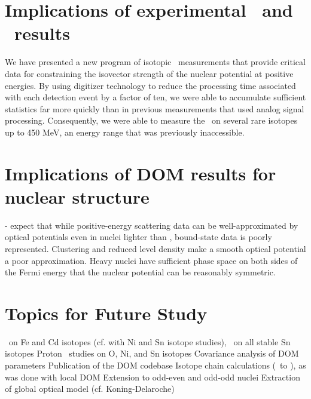\section{Implications of experimental \tot\ and \el\ results}
We have presented a new program of isotopic \tot\ measurements that provide critical data for
constraining the isovector strength of the nuclear potential at positive energies. By using
digitizer technology to reduce the processing time associated with each detection event by a factor
of ten, we were able to accumulate sufficient statistics far more quickly than in previous
measurements that used analog signal processing. Consequently, we were able to measure the \tot\ on
several rare isotopes up to 450 MeV, an energy range that was previously inaccessible.

\section{Implications of DOM results for nuclear structure}
- expect that while positive-energy scattering data can be well-approximated by
optical potentials even in nuclei lighter than \oSix, bound-state data is poorly
represented. Clustering and reduced level density make a smooth optical
potential a poor approximation. Heavy nuclei have sufficient phase space on both
sides of the Fermi energy that the nuclear potential can be reasonably
symmetric.

\section{Topics for Future Study}
\tot\ on Fe and Cd isotopes (cf. with Ni and Sn isotope studies), \tot\ on all stable Sn isotopes
Proton \rxn\ studies on O, Ni, and Sn isotopes
Covariance analysis of DOM parameters
Publication of the DOM codebase
Isotope chain calculations (\snTwelve\ to \snFour), as was done with local DOM
Extension to odd-even and odd-odd nuclei
Extraction of global optical model (cf. Koning-Delaroche)
